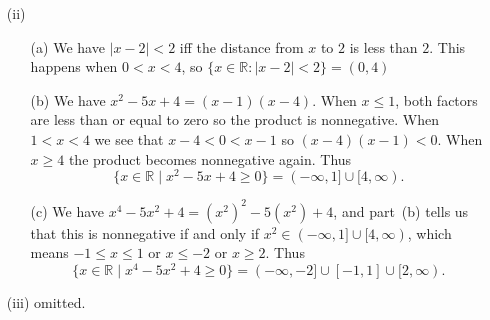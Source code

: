 \documentclass{amsart}
\renewcommand{\:}       {\colon}
\newcommand{\R}         {{\mathbb{R}}}
\newcommand{\st}        {\;|\;}
\begin{document}
\begin{itemize}
\begin{itemize}
\begin{itemize}
\begin{align*}
                   &= (A+C)x^2 + (2A+B-C)x + (2B+3C).
      \end{align*}
      Putting $x=-2$ gives 
      \[ 7.(-2)^2 -2.(-2) + 13 = C((-2)^2 -(-2) + 3), \]
      or $45=9C$, so $C=5$.  Comparing coefficients in the previous
      equation gives $A+C=7$ and $2B+3C=13$, so $A=7-C=2$ and
      $B=(13-3C)/2=-1$.  We thus have
      \[ \frac{7x^2-2x+13}{(x+2)(x^2-x+3)} = 
          \frac{2x-1}{x^2-x+3} + \frac{5}{x+2}. 
      \]
     \item[(b)]
      We now integrate the above equation.  For the first term, put
      $u=x^2-x+3$, so $du=(2x-1)dx$, so
      \[ \int \frac{2x-1}{x^2-x+3} dx = \int \frac{du}{u} = 
          \log(u) = \log(x^2-x+3).
      \]
      We also have $\int(x+2)^{-1}dx=\log(x+2)$, so
      \[ \int \frac{7x^2-2x+13}{(x+2)(x^2-x+3)}dx =
          \log(x^2-x+3) + 5 \log(x+2).
      \] 
      \begin{align*}
        \int_1^2 \frac{7x^2-2x+13}{(x+2)(x^2-x+3)}dx &=
          \left[\log(x^2-x+3) + 5 \log(x+2)\right]_1^2 \\ &= 
          \log(5) + 5 \log(4) - \log(3) - 5 \log(3) = 
          \log(5) + 10\log(2) - 6\log(3).
      \end{align*} 
    \end{itemize}
   \item[(ii)]
    \begin{itemize}
     \item[(a)] We have $|x-2|<2$ iff the distance from $x$ to $2$ is
      less than $2$.  This happens when $0<x<4$, so
      $\{x\in\R:|x-2|<2\}=(0,4)$
     \item[(b)] We have $x^2-5x+4=(x-1)(x-4)$.  When $x\leq 1$, both
      factors are less than or equal to zero so the product is
      nonnegative.  When $1<x<4$ we see that $x-4<0<x-1$ so
      $(x-4)(x-1)<0$.  When $x\geq 4$ the product becomes nonnegative
      again.  Thus 
      \[ \{x\in\R\st x^2-5x+4\geq 0\} = (-\infty,1]\cup [4,\infty). \]
     \item[(c)] We have $x^4-5x^2+4=(x^2)^2-5(x^2)+4$, and part~(b)
      tells us that this is nonnegative if and only if
      $x^2\in(-\infty,1]\cup[4,\infty)$, which means $-1\leq x\leq 1$
      or $x\leq -2$ or $x\geq 2$.  Thus 
      \[ \{x\in\R\st x^4-5x^2+4\geq 0\} = 
         (-\infty,-2]\cup[-1,1]\cup[2,\infty).
      \]
    \end{itemize}
   \item[(iii)] omitted.
  \end{itemize}
\end{itemize}
\end{document}
